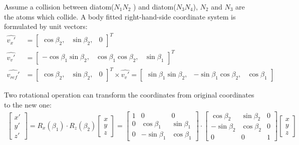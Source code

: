 \documentclass[11pt,letterpaper]{article}
\begin{document}
Assume a collision between diatom($ N_1N_2$ ) and diatom($ N_3N_4 $), $N_2$ and $N_3$ are the atoms which collide. A body fitted right-hand-side coordinate system is formulated by unit vectors:
\begin{equation}
\begin{aligned}
\hat{v_x'} &= \begin{bmatrix}
\cos \beta_2, & \sin \beta_2, & 0
\end{bmatrix}^T  \\
\hat{v_v'} &= \begin{bmatrix}
-\cos \beta_1 \sin \beta_2, & \cos \beta_1 \cos \beta_2, & \sin \beta_1
\end{bmatrix}^T  \\
\hat{v_{ref}'} &= \begin{bmatrix}
\cos \beta_2, & \sin \beta_2, & 0 
\end{bmatrix}^T \times \hat{v_v'} = \begin{bmatrix}
\sin \beta_1 \sin \beta_2, & - \sin \beta_1 \cos \beta_2, & \cos \beta_1
\end{bmatrix} 
\end{aligned}
\end{equation}


Two rotational operation can transform the coordinates from original coordinates to the new one:
\begin{equation}
\begin{aligned}
\begin{bmatrix}
x' \\ y' \\z' 
\end{bmatrix}  = R_x (\beta_1) \cdot R_z(\beta_2) \begin{bmatrix}
x\\y\\z
\end{bmatrix}= \begin{bmatrix}
1 & 0 & 0 \\ 
0 & \cos \beta_1 & \sin \beta_1 \\ 
0 & -\sin \beta_1 & \cos \beta_1
\end{bmatrix} \cdot \begin{bmatrix} 
\cos \beta_2 & \sin \beta_2  & 0\\ 
-\sin \beta_2 & \cos \beta_2 & 0\\
0 & 0 &1
\end{bmatrix} \begin{bmatrix}
x\\y\\z
\end{bmatrix} 
\end{aligned}
\end{equation} 
\end{document}

